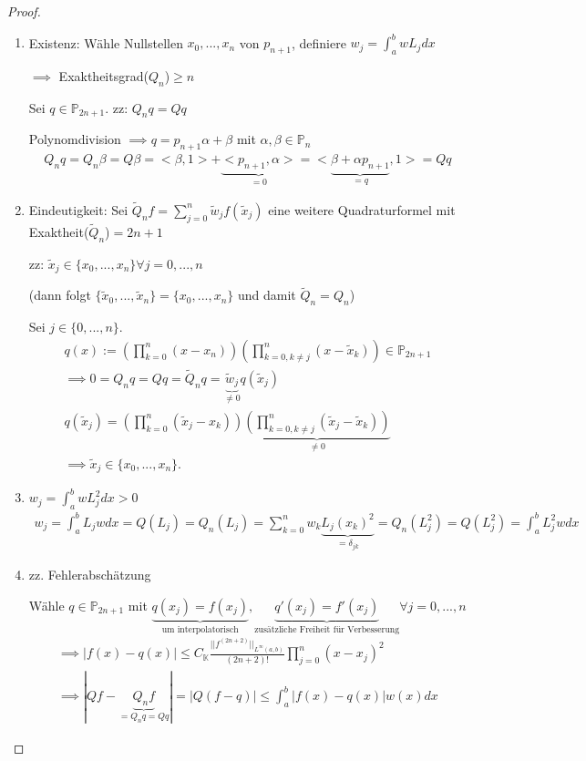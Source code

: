 \begin{proof}
	\begin{enumerate}
		\item Existenz: Wähle Nullstellen $x_0, ..., x_n$ von $p_{n+1}$, definiere $w_j = \int_{a}^{b} wL_j dx$
		
		$\implies$ Exaktheitsgrad($Q_n$)$\geq n$
		
		Sei $q \in \mathbb{P}_{2n+1}$. zz: $Q_nq = Qq$
		
		Polynomdivision $\implies q = p_{n+1} \alpha + \beta$ mit $\alpha, \beta \in \mathbb{P}_n$
		\begin{align*}
			Q_nq = Q_n\beta = Q\beta = <\beta, 1> + \underbrace{<p_{n+1}, \alpha>}_{=0} = <\underbrace{\beta + \alpha p_{n+1}}_{=q} , 1> = Qq
		\end{align*}
		
		\item Eindeutigkeit: Sei $\tilde{Q}_nf = \sum_{j=0}^{n} \tilde{w}_j f(\tilde{x}_j)$ eine weitere Quadraturformel mit Exaktheit($\tilde{Q}_n$)$=2n+1$
		
		zz: $\tilde{x}_j \in \{x_0, ..., x_n\} \forall j=0, ..., n$
		
		(dann folgt $\{\tilde{x}_0, ..., \tilde{x}_n\} = \{x_0, ..., x_n\}$ und damit $\tilde{Q}_n = Q_n$)
		
		Sei $j \in \{0, ..., n\}$.
		\begin{align*}
			q(x) := \left(\prod_{k=0}^{n} (x-x_n) \right) \left( \prod_{k=0, k\neq j}^{n} (x-\tilde{x}_k) \right) \in \mathbb{P}_{2n+1}\\
			\implies 0 = Q_nq = Qq = \tilde{Q}_nq = \underbrace{\tilde{w}_j}_{\neq 0} q(\tilde{x}_j)\\
			q(\tilde{x}_j) = \left( \prod_{k=0}^{n} (\tilde{x}_j - x_k) \right) \underbrace{\left( \prod_{k=0, k\neq j}^{n} (\tilde{x}_j - \tilde{x}_k) \right)}_{\neq 0}\\
			\implies \tilde{x}_j \in \{x_0, ..., x_n\}.
		\end{align*}
		
		\item $w_j = \int_{a}^{b} wL_j^2 dx > 0$
		\begin{align*}
			w_j = \int_{a}^{b} L_jw dx = Q(L_j) = Q_n(L_j) = \sum_{k=0}^{n} w_k \underbrace{L_j(x_k)^2}_{=\delta_{jk}} = Q_n(L_j^2) = Q(L_j^2) = \int_{a}^{b} L_j^2 w dx
		\end{align*}
		
		\item zz. Fehlerabschätzung
		
		Wähle $q \in \mathbb{P}_{2n+1}$ mit $\underbrace{q(x_j) = f(x_j)}_{\text{um interpolatorisch}}, \underbrace{q'(x_j)=f'(x_j)}_{\text{zusätzliche Freiheit für Verbesserung}} \forall j=0, ..., n$
		\begin{align*}
			\implies |f(x) - q(x)| \leq C_\mathbb{K} \frac{||f^{(2n+2)}||_{L^\infty(a,b)}}{(2n+2)!} \prod_{j=0}^{n} (x-x_j)^2\\
			\implies |Qf - \underbrace{Q_nf}_{=Q_nq=Qq}| = |Q(f-q)| \leq \int_{a}^{b} |f(x) - q(x)| w(x) dx
		\end{align*}
	\end{enumerate}
\end{proof}


